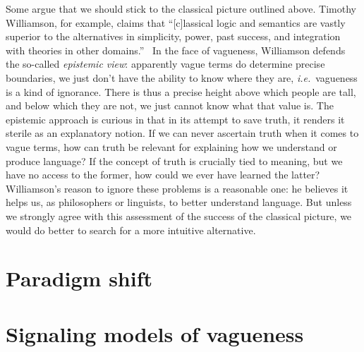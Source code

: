 \documentclass[a4paper]{article}
\begin{document}
Some argue that we should stick to the classical picture outlined above.
Timothy Williamson, for example, claims that ``[c]lassical logic and semantics are vastly superior to the alternatives in simplicity, power, past success, and integration with theories in other domains.''~\parencite*[162]{williamson_vagueness_1992}
In the face of vagueness, Williamson defends the so-called \emph{epistemic view}: apparently vague terms do determine precise boundaries, we just don't have the ability to know where they are, \emph{i.e.}~vagueness is a kind of ignorance.
There is thus a precise height above which people are tall, and below which they are not, we just cannot know what that value is.
The epistemic approach is curious in that in its attempt to save truth, it renders it sterile as an explanatory notion.
If we can never ascertain truth when it comes to vague terms, how can truth be relevant for explaining how we understand or produce language?
If the concept of truth is crucially tied to meaning, but we have no access to the former, how could we ever have learned the latter?
Williamson's reason to ignore these problems is a reasonable one: he believes it helps us, as philosophers or linguists, to better understand language.
But unless we strongly agree with this assessment of the success of the classical picture, we would do better to search for a more intuitive alternative.



\section{Paradigm shift}
\label{sec:Wittgenstein-and-signaling}

\section{Signaling models of vagueness}
\label{sec:vague-signaling}


\printbibliography
\end{document}
